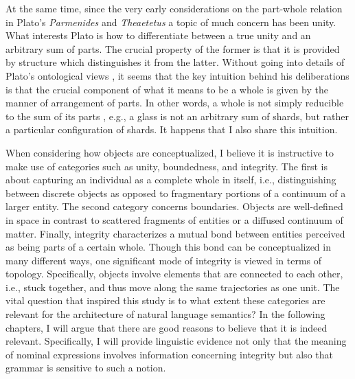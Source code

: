     At the same time, since the very early considerations on the part-whole relation in Plato's \textit{Parmenides} and \textit{Theaetetus} a topic of much concern has been unity. What interests Plato is how to differentiate between a true unity and an arbitrary sum of parts. The crucial property of the former is that it is provided by structure which distinguishes it from the latter. Without going into details of Plato's ontological views \citep[but see, e.g.,][]{priest2014one}, it seems that the key intuition behind his deliberations is that the crucial component of what it means to be a whole is given by the manner of arrangement of parts. In other words, a whole is not simply reducible to the sum of its parts \citep[see also][]{casati_varzi1999parts}, e.g., a glass is not an arbitrary sum of shards, but rather a particular configuration of shards. It happens that I also share this intuition.

When considering how objects are conceptualized, I believe it is instructive to make use of categories such as unity, boundedness, and integrity. The first is about capturing an individual as a complete whole in itself, i.e., distinguishing between discrete objects as opposed to fragmentary portions of a continuum of a larger entity. The second category concerns boundaries. Objects are well-defined in space in contrast to scattered fragments of entities or a diffused continuum of matter. Finally, integrity characterizes a mutual bond between entities perceived as being parts of a certain whole. Though this bond can be conceptualized in many different ways, one significant mode of integrity is viewed in terms of topology. Specifically, objects involve elements that are connected to each other, i.e., stuck together, and thus move along the same trajectories as one unit. The vital question that inspired this study is to what extent these categories are relevant for the architecture of natural language semantics? In the following chapters, I will argue that there are good reasons to believe that it is indeed relevant. Specifically, I will provide linguistic evidence not only that the meaning of nominal expressions involves information concerning integrity but also that grammar is sensitive to such a notion.

